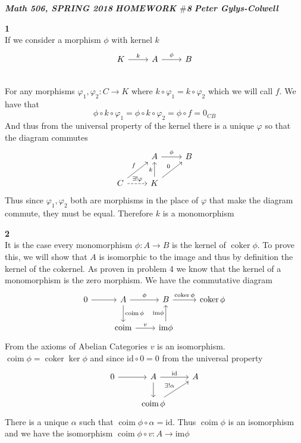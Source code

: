 \documentclass[12pt]{article}
\newenvironment{ques}[1]{\textbf{#1}\vspace{1 mm}\\ }{\bigskip}
\theoremstyle{definition}
\DeclareMathOperator\coker{coker}
\DeclareMathOperator\coim{coim}
\renewcommand{\a}{\alpha}
\newcommand{\im}{\text{im}}
\newcommand{\id}{\text{id}}
\begin{document}
\noindent \textit{\textbf{Math 506, SPRING 2018}} \hspace{1.3cm}
\textit{\textbf{HOMEWORK $\#$8}} \hspace{1.3cm} \textit{\textbf{Peter
Gylys-Colwell}} 

\vspace{1cm}

\begin{ques}{1}
	If we consider a morphism $\phi$ with kernel $k$
	$$\begin{tikzcd}
	K \arrow[r, "k"] & A \arrow[r, "\phi"] & B\\
	\end{tikzcd}$$
	For any morphisms $\varphi_1,\varphi_2:C \to K$ where $k \circ \varphi_1 =
	k \circ \varphi_2$ which we will call $f$. We have that 
	$$\phi \circ k \circ \varphi_1 = \phi \circ
	k \circ \varphi_2 = \phi \circ f =0_{CB}$$
	And thus from the universal property of the kernel there is a unique
	$\varphi$ so that the diagram commutes
	$$\begin{tikzcd}
	& A \arrow[r, "\phi"] & B\\
	C \arrow[ur, "f"] \arrow[r,dashrightarrow,"\exists ! \varphi"]& K
	\arrow[u,"k"] \arrow[ur, "0"]& 
	\end{tikzcd}$$
	Thus since $\varphi_1, \varphi_2$ both are morphisms in the place of
	$\varphi$ that make the diagram commute, they must be equal. Therefore $k$
	is a monomorphism
\end{ques}

\begin{ques}{2}
	It is the case every monomorphism $\phi: A \to B$ is the kernel of $\coker
	\phi$. To prove this, we will show that $A$ is isomorphic to the image and
	thus by definition the kernel of the cokernel. As
	proven in problem 4 we know that the kernel of a monomorphism is the zero
	morphism. We have the commutative diagram
	$$\begin{tikzcd}
	0 \arrow[r] & A \arrow[d, "\coim \phi"]\arrow[r, "\phi"] & B \arrow[r,
	"\coker \phi"] & \coker \phi \\
	 & \coim  \arrow[r, "v"] & \im \phi \arrow[u, "\im \phi"]
	\end{tikzcd}$$
	From the axioms of Abelian Categories $v$ is an isomorphism. $\coim \phi =
	\coker \ker \phi$ and since $\id \circ 0 = 0$ from the universal property
	$$\begin{tikzcd}
	0 \arrow[r] & A \arrow[d]\arrow[r, "\id"] & A \\
	 & \coim \phi \arrow[ur, "\exists ! \a"] & 
	\end{tikzcd}$$
	There is a unique $\a$ such that $\coim \phi \circ \a = \id$. Thus $\coim
	\phi$ is an isomorphism and we have the isomorphism $\coim \phi \circ v :
	A \to \im \phi$
\end{ques}
\end{document}
